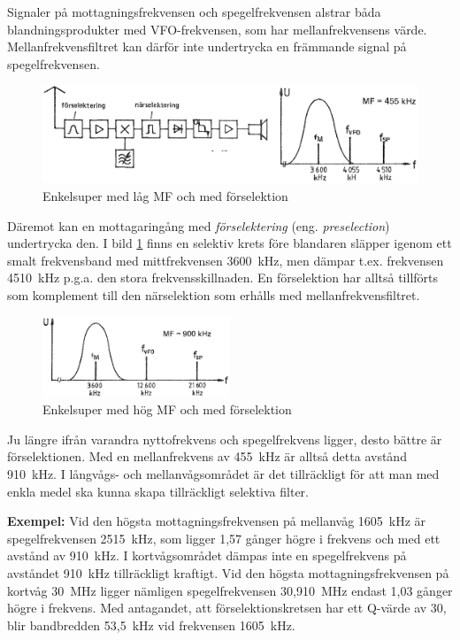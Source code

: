 Signaler på mottagningsfrekvensen och spegelfrekvensen alstrar båda
blandningsprodukter med VFO-frekvensen, som har mellanfrekvensens värde.
Mellanfrekvensfiltret kan därför inte undertrycka en främmande signal på
spegelfrekvensen.

\begin{figure}
  \includegraphics[width=\textwidth]{images/cropped_pdfs/bild_2_4-23.pdf}
  \caption{Enkelsuper med låg MF och med förselektion}
  \label{fig:bildII4-23}
\end{figure}

Däremot kan en mottagaringång med \emph{förselektering} (eng.
\emph{preselection}) undertrycka den.
I bild \ref{fig:bildII4-23} finns en selektiv krets före blandaren släpper
igenom ett smalt frekvensband med mittfrekvensen 3600~kHz, men dämpar t.ex.
frekvensen 4510~kHz p.g.a. den stora frekvensskillnaden.
En förselektion har alltså tillförts som komplement till den närselektion som
erhålls med mellanfrekvensfiltret.

\begin{figure}
  \includegraphics[width=0.5\textwidth]{images/cropped_pdfs/bild_2_4-24.pdf}
  \caption{Enkelsuper med hög MF och med förselektion}
  \label{fig:bildII4-24}
\end{figure}

Ju längre ifrån varandra nyttofrekvens och spegelfrekvens ligger, desto bättre
är förselektionen.
Med en mellanfrekvens av 455~kHz är alltså detta avstånd 910~kHz.
I långvågs- och mellanvågsområdet är det tillräckligt för att man med enkla
medel ska kunna skapa tillräckligt selektiva filter.

\textbf{Exempel:}
Vid den högsta mottagningsfrekvensen på mellanvåg 1605~kHz är spegelfrekvensen
2515~kHz, som ligger 1,57 gånger högre i frekvens och med ett avstånd av
910~kHz.
I kortvågsområdet dämpas inte en spegelfrekvens på avståndet 910~kHz
tillräckligt kraftigt.
Vid den högsta mottagningsfrekvensen på kortvåg 30~MHz ligger nämligen
spegelfrekvensen 30,910~MHz endast 1,03 gånger högre i frekvens.
Med antagandet, att förselektionskretsen har ett Q-värde av 30, blir
bandbredden 53,5~kHz vid frekvensen 1605~kHz.

